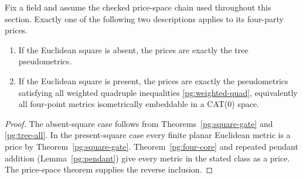 \begin{corollary}
\label{pg:four-conditional}
Fix a field and assume the checked price-space chain used throughout
this section. Exactly one of the following two descriptions applies
to its four-party prices.
\begin{enumerate}
\item If the Euclidean square is absent, the prices are exactly the
      tree pseudometrics.
\item If the Euclidean square is present, the prices are exactly the
      pseudometrics satisfying all weighted quadruple inequalities
      \eqref{pg:weighted-quad}, equivalently all four-point metrics
      isometrically embeddable in a CAT(0) space.
\end{enumerate}
\end{corollary}
\begin{proof}
The absent-square case follows from Theorems~\ref{pg:square-gate} and
\ref{pg:tree-all}. In the present-square case every finite planar
Euclidean metric is a price by Theorem~\ref{pg:square-gate}.
Theorem~\ref{pg:four-core} and repeated pendant addition
(Lemma~\ref{pg:pendant}) give every metric in the stated class as
a price. The price-space theorem supplies the reverse inclusion.
\end{proof}

